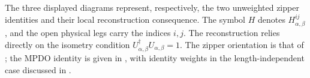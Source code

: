 The three displayed diagrams represent, respectively, the two unweighted
zipper identities and their local reconstruction consequence. The symbol
$H$ denotes $H_{\alpha,\beta}^{ij}$, and the open physical legs carry the
indices $i,j$. The reconstruction relies directly on the isometry condition
$U_{\alpha,\beta}^{\dagger}U_{\alpha,\beta}=1$. The zipper orientation is that of
\cite[Section~3, Equations~(19)--(21)]{Bultinck2017Anyons}; the MPDO identity
is given in \cite[Theorem~4.14(iii), lines~986--991]{Cirac2016MPDO_arXiv},
with identity weights in the length-independent case discussed in
\cite[line~1010]{Cirac2016MPDO_arXiv}.
\par\noindent\hfil
\tenkzkernel
\begin{tenkz}[rows={op,op}, cols=2, east=open]
\end{tenkz}
